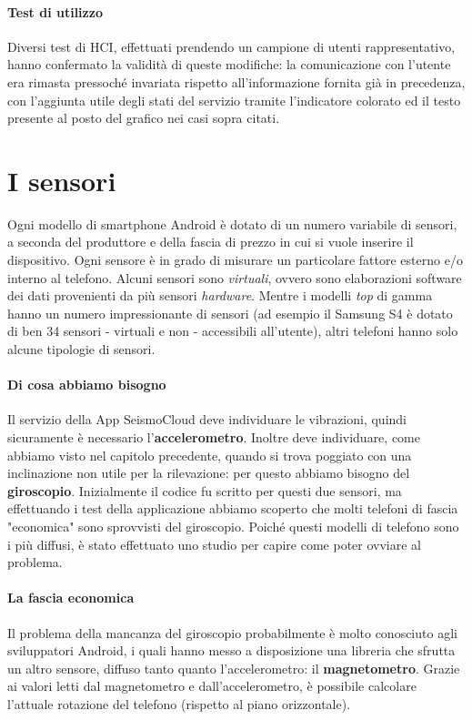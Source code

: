 \documentclass[a4paper,10pt]{memoir}
\begin{document}
\paragraph{Test di utilizzo} Diversi test di HCI, effettuati prendendo un campione di utenti rappresentativo, hanno confermato la validità di queste modifiche: la comunicazione con l'utente era rimasta pressoché invariata rispetto all'informazione fornita già in precedenza, con l'aggiunta utile degli stati del servizio tramite l'indicatore colorato ed il testo presente al posto del grafico nei casi sopra citati.

\section{I sensori}
\label{section:sensori}

Ogni modello di smartphone Android è dotato di un numero variabile di sensori, a seconda del produttore e della fascia di prezzo in cui si vuole inserire il dispositivo. Ogni sensore è in grado di misurare un particolare fattore esterno e/o interno al telefono. Alcuni sensori sono \textit{virtuali}, ovvero sono elaborazioni software dei dati provenienti da più sensori \textit{hardware}. Mentre i modelli \textit{top} di gamma hanno un numero impressionante di sensori (ad esempio il Samsung S4 è dotato di ben 34 sensori - virtuali e non - accessibili all'utente), altri telefoni hanno solo alcune tipologie di sensori.

\paragraph{Di cosa abbiamo bisogno} Il servizio della App SeismoCloud deve individuare le vibrazioni, quindi sicuramente è necessario l'\textbf{accelerometro}. Inoltre deve individuare, come abbiamo visto nel capitolo precedente, quando si trova poggiato con una inclinazione non utile per la rilevazione: per questo abbiamo bisogno del \textbf{giroscopio}. Inizialmente il codice fu scritto per questi due sensori, ma effettuando i test della applicazione abbiamo scoperto che molti telefoni di fascia "economica" sono sprovvisti del giroscopio. Poiché questi modelli di telefono sono i più diffusi, è stato effettuato uno studio per capire come poter ovviare al problema.

\paragraph{La fascia economica} Il problema della mancanza del giroscopio probabilmente è molto conosciuto agli sviluppatori Android, i quali hanno messo a disposizione una libreria che sfrutta un altro sensore, diffuso tanto quanto l'accelerometro: il \textbf{magnetometro}. Grazie ai valori letti dal magnetometro e dall'accelerometro, è possibile calcolare l'attuale rotazione del telefono (rispetto al piano orizzontale).
\end{document}
